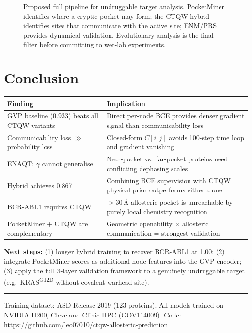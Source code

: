 \documentclass[11pt,a4paper]{article}
\begin{document}
\begin{figure}[H]
\caption{Proposed full pipeline for undruggable target analysis.
PocketMiner identifies where a cryptic pocket may form; the CTQW hybrid
identifies sites that communicate with the active site;
ENM\slash{}PRS provides dynamical validation. Evolutionary analysis is the final filter before
committing to wet-lab experiments.}
\end{figure}

\section{Conclusion}

\begin{table}[H]
\centering
\begin{tabular}{p{5.0cm} p{9.0cm}}
\toprule
\textbf{Finding} & \textbf{Implication} \\
\midrule
GVP baseline (0.933) beats all CTQW variants &
  Direct per-node BCE provides denser gradient signal than communicability loss \\
\addlinespace
Communicability loss $\gg$ probability loss &
  Closed-form $C[i,j]$ avoids 100-step time loop and gradient vanishing \\
\addlinespace
ENAQT: $\gamma$ cannot generalise &
  Near-pocket vs.\ far-pocket proteins need conflicting dephasing scales \\
\addlinespace
Hybrid achieves 0.867 &
  Combining BCE supervision with CTQW physical prior outperforms either alone \\
\addlinespace
BCR-ABL1 requires CTQW &
  $>30$\,\r{A} allosteric pocket is unreachable by purely local chemistry recognition \\
\addlinespace
PocketMiner + CTQW are complementary &
  Geometric openability $\times$ allosteric communication = strongest validation \\
\bottomrule
\end{tabular}
\end{table}

\vspace{0.5em}
\noindent\textbf{Next steps:} (1) longer hybrid training to recover BCR-ABL1 at 1.00;
(2) integrate PocketMiner scores as additional node features into the GVP encoder;
(3) apply the full 3-layer validation framework to a genuinely undruggable target
(e.g.\ KRAS\textsuperscript{G12D} without covalent warhead site).

\vspace{2em}
\hrule
\vspace{0.5em}
\noindent\small\sffamily\color{cGray}
Training dataset: ASD Release 2019 (123 proteins).
All models trained on NVIDIA H200, Cleveland Clinic HPC (GOV114009).
Code: \url{https://github.com/leo07010/ctqw-allosteric-prediction}
\end{document}
